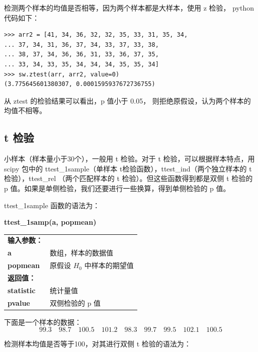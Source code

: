 检测两个样本的均值是否相等，因为两个样本都是大样本，使用 z 检验， python 代码如下：
\begin{lstlisting}[Language=Python]
>>> arr2 = [41, 34, 36, 32, 32, 35, 33, 31, 35, 34,
... 37, 34, 31, 36, 37, 34, 33, 37, 33, 38,
... 38, 37, 34, 36, 36, 31, 33, 36, 37, 35,
... 33, 34, 33, 35, 34, 34, 34, 35, 35, 34]
>>> sw.ztest(arr, arr2, value=0)
(3.775645601380307, 0.0001595937672736755)
\end{lstlisting}

从 ztest 的检验结果可以看出，p 值小于 0.05， 则拒绝原假设，认为两个样本的均值不相等。

\subsection{t 检验}
小样本（样本量小于30个），一般用 t 检验。对于 t 检验，可以根据样本特点，用 scipy 包中的 ttest\_1sample（单样本 t检验函数），ttest\_ind（两个独立样本的 t 检验），ttest\_rel （两个匹配样本的 t 检验）。但这些函数得到都是双侧 t 检验的 p 值。如果是单侧检验，我们还要进行一些换算，得到单侧检验的 p 值。

ttest\_1sample 函数的语法为：

\begin{center}
\begin{tcolorbox}[title = ttest\_1sample 函数的语法]
\textbf{ttest\_1samp(a, popmean)}
\tcblower
\vspace{2pt}
\begin{tcboutputlisting}
\begin{tabular}{>{\bfseries}ll}
  输入参数：&\\
  a &数组，样本的数据值\\
  popmean & 原假设 $H_0$ 中样本的期望值\\
\specialrule{0em}{2pt}{2pt}
返回值：&\\
statistic & 统计量值\\
pvalue & 双侧检验的 p 值
\end{tabular}
\end{tcboutputlisting}
\tcbuselistingtext
\end{tcolorbox}
\end{center}

下面是一个样本的数据：
\begin{equation}
  99.3\quad 98.7\quad 100.5\quad 101.2\quad 98.3\quad 99.7\quad 99.5\quad 102.1\quad 100.5\nonumber
\end{equation}

检测样本均值是否等于100，对其进行双侧 t 检验的语法为：

